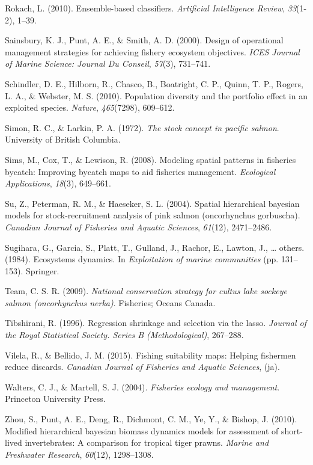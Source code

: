 \documentclass[12pt,]{scrartcl}
\begin{document}
\hypertarget{ref-rokach2010ensemble}{}
Rokach, L. (2010). Ensemble-based classifiers. \emph{Artificial
Intelligence Review}, \emph{33}(1-2), 1--39.

\hypertarget{ref-sainsbury2000design}{}
Sainsbury, K. J., Punt, A. E., \& Smith, A. D. (2000). Design of
operational management strategies for achieving fishery ecosystem
objectives. \emph{ICES Journal of Marine Science: Journal Du Conseil},
\emph{57}(3), 731--741.

\hypertarget{ref-schindler2010population}{}
Schindler, D. E., Hilborn, R., Chasco, B., Boatright, C. P., Quinn, T.
P., Rogers, L. A., \& Webster, M. S. (2010). Population diversity and
the portfolio effect in an exploited species. \emph{Nature},
\emph{465}(7298), 609--612.

\hypertarget{ref-simon1972stock}{}
Simon, R. C., \& Larkin, P. A. (1972). \emph{The stock concept in
pacific salmon}. University of British Columbia.

\hypertarget{ref-sims2008modeling}{}
Sims, M., Cox, T., \& Lewison, R. (2008). Modeling spatial patterns in
fisheries bycatch: Improving bycatch maps to aid fisheries management.
\emph{Ecological Applications}, \emph{18}(3), 649--661.

\hypertarget{ref-su2004spatial}{}
Su, Z., Peterman, R. M., \& Haeseker, S. L. (2004). Spatial hierarchical
bayesian models for stock-recruitment analysis of pink salmon
(oncorhynchus gorbuscha). \emph{Canadian Journal of Fisheries and
Aquatic Sciences}, \emph{61}(12), 2471--2486.

\hypertarget{ref-sugihara1984ecosystems}{}
Sugihara, G., Garcia, S., Platt, T., Gulland, J., Rachor, E., Lawton,
J., \ldots{} others. (1984). Ecosystems dynamics. In \emph{Exploitation
of marine communities} (pp. 131--153). Springer.

\hypertarget{ref-team2009national}{}
Team, C. S. R. (2009). \emph{National conservation strategy for cultus
lake sockeye salmon (oncorhynchus nerka)}. Fisheries; Oceans Canada.

\hypertarget{ref-tibshirani1996regression}{}
Tibshirani, R. (1996). Regression shrinkage and selection via the lasso.
\emph{Journal of the Royal Statistical Society. Series B
(Methodological)}, 267--288.

\hypertarget{ref-vilela2015fishing}{}
Vilela, R., \& Bellido, J. M. (2015). Fishing suitability maps: Helping
fishermen reduce discards. \emph{Canadian Journal of Fisheries and
Aquatic Sciences}, (ja).

\hypertarget{ref-walters2004fisheries}{}
Walters, C. J., \& Martell, S. J. (2004). \emph{Fisheries ecology and
management}. Princeton University Press.

\hypertarget{ref-zhou2010modified}{}
Zhou, S., Punt, A. E., Deng, R., Dichmont, C. M., Ye, Y., \& Bishop, J.
(2010). Modified hierarchical bayesian biomass dynamics models for
assessment of short-lived invertebrates: A comparison for tropical tiger
prawns. \emph{Marine and Freshwater Research}, \emph{60}(12),
1298--1308.
\end{document}
